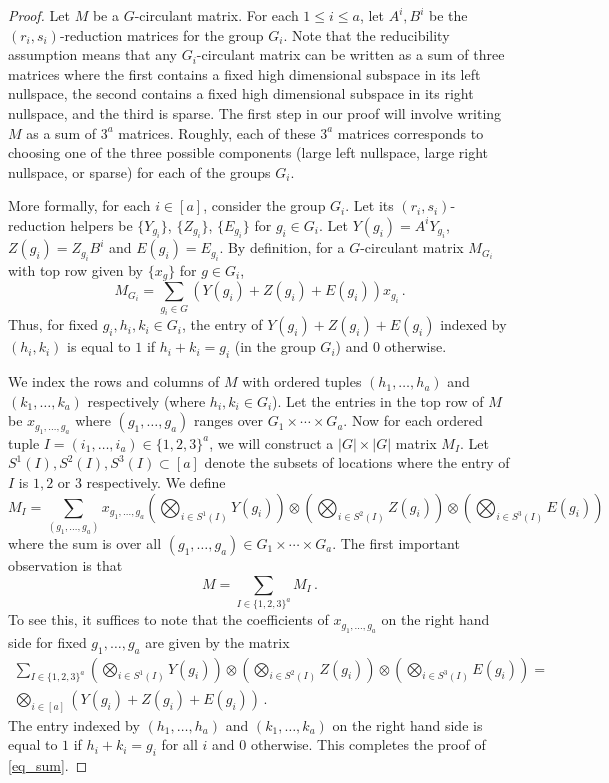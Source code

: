 \documentclass[11pt]{article}
\numberwithin{equation}{section}
\theoremstyle{definition}
\theoremstyle{plain}
\theoremstyle{definition}
\begin{document}
\begin{proof}
Let $M$ be a $G$-circulant matrix.  For each $1 \leq i \leq a$, let $A^i,B^i$ be the $(r_i,s_i)$-reduction matrices for the group $G_i$.  Note that the reducibility assumption means that any $G_i$-circulant matrix can be written as a sum of three matrices where the first contains a fixed high dimensional subspace in its left nullspace, the second contains a fixed high dimensional subspace in its right nullspace, and the third is sparse.  The first step in our proof will involve writing $M$ as a sum of $3^a$ matrices.  Roughly, each of these $3^a$ matrices corresponds to choosing one of the three possible components (large left nullspace, large right nullspace, or sparse) for each of the groups $G_i$.  

More formally, for each $i \in [a]$, consider the group $G_i$. Let its $(r_i,s_i)$-reduction helpers be $\{Y_{g_i} \}$, $\{Z_{g_i} \}$, $\{E_{g_i}\}$ for $g_i \in G_i$.   Let $Y(g_i) = A^{i}Y_{g_i}$, $Z(g_i) = Z_{g_i}B^i$ and  $E(g_i) = E_{g_i}$.  By definition, for a $G$-circulant matrix $M_{G_i}$ with top row given by $\{x_{g} \}$ for  $g \in G_i$,
\[
M_{G_i} = \sum_{g_i \in G} (Y(g_i) + Z(g_i) + E(g_i))x_{g_i} \,.
\]
Thus, for fixed $g_i, h_i,k_i \in G_i$, the entry of $Y( g_i) + Z( g_i) + E(g_i)$ indexed by $(h_i,k_i)$ is equal to  $1$ if $h_i + k_i = g_i$ (in the group $G_i$) and $0$ otherwise.

We index the rows and columns of $M$ with ordered tuples $(h_1, \dots , h_a)$ and $(k_1, \dots , k_a)$ respectively (where $h_i,k_i \in G_i$).  Let the entries in the top row of $M$ be $x_{g_1, \dots , g_a}$ where $(g_1, \dots , g_a)$ ranges over  $ G_1 \times \cdots \times G_a$. Now for each ordered tuple $I = (i_1, \dots ,i_a) \in \{1,2,3 \}^a$, we will construct a $|G| \times |G|$ matrix $M_I$.  Let $S^1(I), S^2(I), S^3(I) \subset [a]$ denote the subsets of locations where the entry of $I$ is $1,2$ or $3$ respectively.  We define
\[
M_I = \sum_{(g_1, \dots , g_a)} x_{g_1, \dots , g_a} \left(\bigotimes_{i \in S^1(I)}Y( g_i) \right) \otimes \left(\bigotimes_{i \in S^2(I)}Z( g_i)\right) \otimes \left(\bigotimes_{i \in S^3(I)}E(g_i) \right)
\] 
where the sum is over all $(g_1, \dots , g_a) \in  G_1 \times \cdots \times G_a$.  The first important observation is that 
\begin{equation}\label{eq_sum}
M =  \sum_{I \in \{1,2,3 \}^a} M_I \,.
\end{equation}
To see this, it suffices to note that the coefficients of $x_{g_1, \dots , g_a}$ on the right hand side for fixed $g_1, \dots , g_a$ are given by the matrix 
\begin{align*}
\sum_{I \in \{1,2,3 \}^a}  \left(\bigotimes_{i \in S^1(I)}Y( g_i) \right) \otimes \left(\bigotimes_{i \in S^2(I)}Z( g_i)\right) \otimes \left(\bigotimes_{i \in S^3(I)}E(g_i) \right) = \\
\bigotimes_{i \in [a]}\left(Y( g_i) + Z(g_i) + E(g_i) \right) \,.
\end{align*}
The entry indexed by $(h_1, \dots , h_a)$ and $(k_1, \dots , k_a)$ on the right hand side is equal to $1$ if $h_i + k_i = g_i$ for all $i$ and $0$ otherwise.  This completes the proof of \eqref{eq_sum}.


\end{proof}
\end{document}

